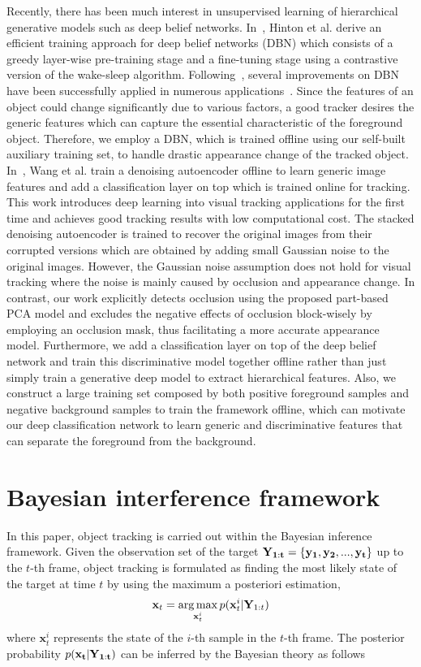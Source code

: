 \documentclass[preprint,12pt,review]{elsarticle}
\begin{document}
Recently, there has been much interest in unsupervised learning of hierarchical generative models such as deep belief networks.
In~\cite{hinton2006fast}, Hinton et al. derive an efficient training approach for deep belief networks (DBN) which consists of a greedy layer-wise pre-training stage and a fine-tuning stage using a contrastive version of the wake-sleep algorithm.
Following~\cite{hinton2006fast}, several improvements on DBN have been successfully applied in numerous applications~\cite{lee2009convolutional,lee2009unsupervised,lee2007sparse}.
Since the features of an object could change significantly due to various factors, a good tracker desires the generic features which can capture the essential characteristic of the foreground object.
Therefore, we employ a DBN, which is trained offline using our self-built auxiliary training set, to handle drastic appearance change of the tracked object.
In~\cite{wang2013learning}, Wang et al. train a denoising autoencoder offline to learn generic image features and add a classification layer on top which is trained online for tracking.
This work introduces deep learning into visual tracking applications for the first time and achieves good tracking results with low computational cost.
The stacked denoising autoencoder is trained to recover the original images from their corrupted versions which are obtained by adding small Gaussian noise to the original images.
However, the Gaussian noise assumption does not hold for visual tracking where the noise is mainly caused by occlusion and appearance change.
In contrast, our work explicitly detects occlusion using the proposed part-based PCA model and excludes the negative effects of occlusion block-wisely by employing an occlusion mask, thus facilitating a more accurate appearance model.
Furthermore, we add a classification layer on top of the deep belief network and train this discriminative model together offline rather than just simply train a generative deep model to extract hierarchical features.
Also, we construct a large training set composed by both positive foreground samples and negative background samples to train the framework offline, which can motivate our deep classification network to learn generic and discriminative features that can separate the foreground from the background.

\section{Bayesian interference framework}
In this paper, object tracking is carried out within the Bayesian inference framework.
Given the observation set of the target ${\bf{Y}_{1:t}} = \{ {\bf{y}_1},{\bf{y}_2},...,{\bf{y}_t}\}$ up to the $t$-th frame, object tracking is formulated as finding the most likely state of the target at time $t$ by using the maximum a posteriori estimation,
\begin{equation}{{\bf{x}}_t} = \mathop {\arg \max }\limits_{{\bf{x}}_t^i} p({\bf{x}}_t^i|{{\bf{Y}}_{1:t}})
\label{eq:MAP}
\end{equation}
where $\mathbf{x}_t^i$ represents the state of the $i$-th sample in the $t$-th frame.
The posterior probability $p({\bf{x}_t}|{\bf{Y}_{1:t}})$ can be inferred by the Bayesian theory as follows
\end{document}

